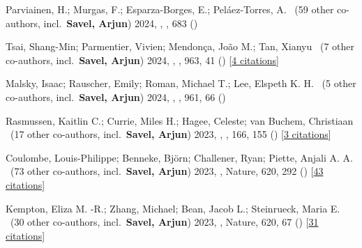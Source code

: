 \item[{\color{numcolor}\scriptsize31}] Parviainen, H.; Murgas, F.; Esparza-Borges, E.; Pel{\'a}ez-Torres, A. \etal\ ({59} other co-authors, incl.\ \textbf{Savel, Arjun}) 2024, , \aanda, {683} ()

\item[{\color{numcolor}\scriptsize30}] Tsai, Shang-Min; Parmentier, Vivien; Mendon{\c{c}}a, Jo{\~a}o M.; Tan, Xianyu \etal\ ({7} other co-authors, incl.\ \textbf{Savel, Arjun}) 2024, , \apj, {963}, 41 () [\href{https://ui.adsabs.harvard.edu/abs/2024ApJ...963...41T}{4 citations}]

\item[{\color{numcolor}\scriptsize29}] Malsky, Isaac; Rauscher, Emily; Roman, Michael T.; Lee, Elspeth K. H. \etal\ ({5} other co-authors, incl.\ \textbf{Savel, Arjun}) 2024, , \apj, {961}, 66 ()

\item[{\color{numcolor}\scriptsize28}] Rasmussen, Kaitlin C.; Currie, Miles H.; Hagee, Celeste; van Buchem, Christiaan \etal\ ({17} other co-authors, incl.\ \textbf{Savel, Arjun}) 2023, , \aj, {166}, 155 () [\href{https://ui.adsabs.harvard.edu/abs/2023AJ....166..155R}{3 citations}]

\item[{\color{numcolor}\scriptsize27}] Coulombe, Louis-Philippe; Benneke, Bj{\"o}rn; Challener, Ryan; Piette, Anjali A. A. \etal\ ({73} other co-authors, incl.\ \textbf{Savel, Arjun}) 2023, , Nature, {620}, 292 () [\href{https://ui.adsabs.harvard.edu/abs/2023Natur.620..292C}{43 citations}]

\item[{\color{numcolor}\scriptsize26}] Kempton, Eliza M. -R.; Zhang, Michael; Bean, Jacob L.; Steinrueck, Maria E. \etal\ ({30} other co-authors, incl.\ \textbf{Savel, Arjun}) 2023, , Nature, {620}, 67 () [\href{https://ui.adsabs.harvard.edu/abs/2023Natur.620...67K}{31 citations}]

